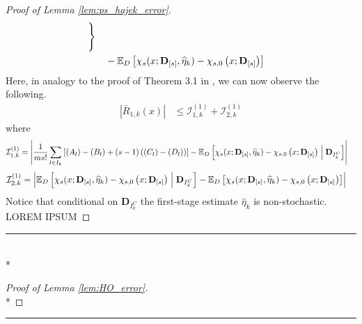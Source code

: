 \begin{proof}[Proof of Lemma \ref{lem:ps_hajek_error}]
\begin{equation}
\begin{aligned}
            \Bigg\} \\
            & \quad - \mathbb{E}_{D}\left[\chi_{s}(x; \mathbf{D}_{[s]}, \widehat{\eta}_{k}) - \chi_{s,0}\left(x; \mathbf{D}_{[s]}\right)\right]
        \end{aligned}
    \end{equation}
    Here, in analogy to the proof of Theorem 3.1 in \citet{chernozhukov_doubledebiased_2018}, we can now observe the following.
    \begin{equation}
        \begin{aligned}
            \left|\bar{R}_{1, k}\left(x\right)\right|
            & \leq \mathcal{I}_{1,k}^{(1)} + \mathcal{I}_{2,k}^{(1)}
        \end{aligned}
    \end{equation}
    where
    \begin{equation}
        \begin{aligned}
            \mathcal{I}_{1,k}^{(1)} 
            & = \left|
            \frac{1}{m s!}\sum_{l \in I_{k}}\left[(A_{l}) - (B_{l}) + (s-1)\left((C_{l}) - (D_{l})\right)\right]
            - \mathbb{E}_{D}\left[\chi_{s}(x; \mathbf{D}_{[s]}, \widehat{\eta}_{k}) - \chi_{s,0}\left(x; \mathbf{D}_{[s]}\right) \; \middle| \; \mathbf{D}_{I_{k}^{C}}\right]\right|
        \end{aligned}
    \end{equation}
    \begin{equation}
        \begin{aligned}
            \mathcal{I}_{2,k}^{(1)} 
            & = \left|\mathbb{E}_{D}\left[\chi_{s}(x; \mathbf{D}_{[s]}, \widehat{\eta}_{k}) - \chi_{s,0}\left(x; \mathbf{D}_{[s]}\right) \; \middle| \; \mathbf{D}_{I_{k}^{C}}\right]
            - \mathbb{E}_{D}\left[\chi_{s}(x; \mathbf{D}_{[s]}, \widehat{\eta}_{k}) - \chi_{s,0}\left(x; \mathbf{D}_{[s]}\right)\right]\right|
        \end{aligned}
    \end{equation}
    Notice that conditional on $\mathbf{D}_{I_{k}^{C}}$ the first-stage estimate $\hat{\eta}_{k}$ is non-stochastic.
{\color{red} LOREM IPSUM}
\end{proof}

\hrule

\begin{lem}\label{lem:HO_error}\mbox{}\\*
    
\end{lem}

\begin{proof}[Proof of Lemma \ref{lem:HO_error}]\mbox{}\\*
    
\end{proof}

\hrule